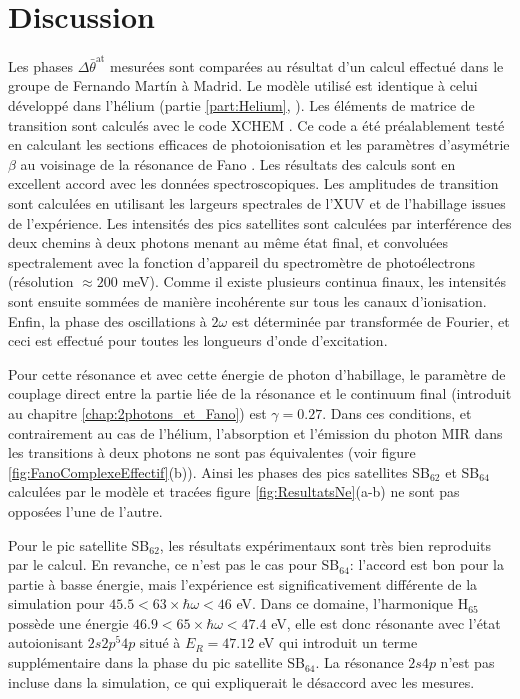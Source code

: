 \section{Discussion}
Les phases $\Delta \bar{\theta}^{\text{at}}$ mesurées sont comparées au résultat d'un calcul effectué dans le groupe de Fernando Mart\'{i}n à Madrid. Le modèle utilisé est identique à celui développé dans l'hélium (partie \ref{part:Helium}, ). Les éléments de matrice de transition sont calculés avec le code XCHEM . Ce code a été préalablement testé en calculant les sections efficaces de photoionisation et les paramètres d'asymétrie $\beta$ au voisinage de la résonance de Fano . Les résultats des calculs sont en excellent accord avec les données spectroscopiques. Les amplitudes de transition sont calculées en utilisant les largeurs spectrales de l'XUV et de l'habillage issues de l'expérience. Les intensités des pics satellites sont calculées par interférence des deux chemins à deux photons menant au même état final, et convoluées spectralement avec la fonction d'appareil du spectromètre de photoélectrons (résolution $\approx 200$ meV). Comme il existe plusieurs continua finaux, les intensités sont ensuite sommées de manière incohérente sur tous les canaux d'ionisation. Enfin, la phase des oscillations à $2 \omega$ est déterminée par transformée de Fourier, et ceci est effectué pour toutes les longueurs d'onde d'excitation.

Pour cette résonance et avec cette énergie de photon d'habillage, le paramètre de couplage direct entre la partie liée de la résonance et le continuum final (introduit au chapitre \ref{chap:2photons_et_Fano}) est $\gamma = 0.27$. Dans ces conditions, et contrairement au cas de l'hélium, l'absorption et l'émission du photon MIR dans les transitions à deux photons ne sont pas équivalentes (voir figure \ref{fig:FanoComplexeEffectif}(b)). Ainsi les phases des pics satellites SB$_{62}$ et SB$_{64}$ calculées par le modèle et tracées figure \ref{fig:ResultatsNe}(a-b) ne sont pas opposées l'une de l'autre.

Pour le pic satellite SB$_{62}$, les résultats expérimentaux sont très bien reproduits par le calcul. En revanche, ce n'est pas le cas pour SB$_{64}$: l'accord est bon pour la partie à basse énergie, mais l'expérience est significativement différente de la simulation pour $45.5 < 63 \times \hbar \omega < 46$ eV. Dans ce domaine, l'harmonique H$_{65}$ possède une énergie $46.9 < 65 \times \hbar \omega < 47.4$ eV, elle est donc résonante avec l'état autoionisant $2s2p^{5}4p$ situé à $E_R = 47.12$ eV qui introduit un terme supplémentaire dans la phase du pic satellite SB$_{64}$. La résonance $2s4p$ n'est pas incluse dans la simulation, ce qui expliquerait le désaccord avec les mesures.

